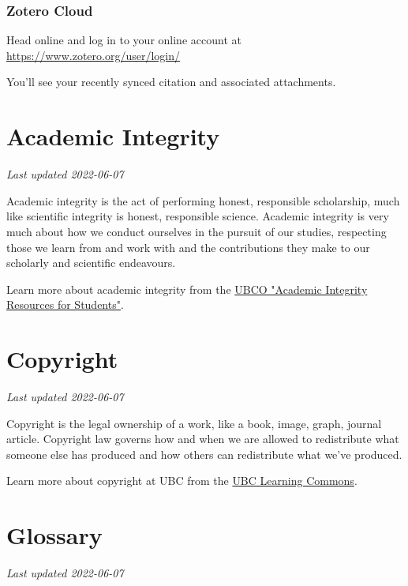 \documentclass[
]{book}
\begin{document}
\hypertarget{zotero-cloud}{%
\subsection*{Zotero Cloud}\label{zotero-cloud}}

Head online and log in to your online account at \url{https://www.zotero.org/user/login/}

You'll see your recently synced citation and associated attachments.

\hypertarget{academic-integrity}{%
\chapter{Academic Integrity}\label{academic-integrity}}

\emph{Last updated 2022-06-07}

Academic integrity is the act of performing honest, responsible scholarship, much like scientific integrity is honest, responsible science. Academic integrity is very much about how we conduct ourselves in the pursuit of our studies, respecting those we learn from and work with and the contributions they make to our scholarly and scientific endeavours.

Learn more about academic integrity from the \href{https://students.ok.ubc.ca/academic-success/learning-hub/online-resources/academic-integrity/}{UBCO "Academic Integrity Resources for Students"}.

\hypertarget{copyright-1}{%
\chapter{Copyright}\label{copyright-1}}

\emph{Last updated 2022-06-07}

Copyright is the legal ownership of a work, like a book, image, graph, journal article. Copyright law governs how and when we are allowed to redistribute what someone else has produced and how others can redistribute what we've produced.

Learn more about copyright at UBC from the \href{https://copyright.ubc.ca/}{UBC Learning Commons}.

\hypertarget{glossary}{%
\chapter{Glossary}\label{glossary}}

\emph{Last updated 2022-06-07}
\end{document}
